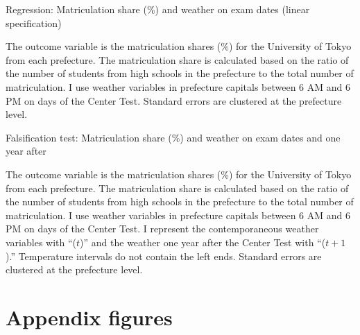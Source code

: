 \documentclass[12pt,letterpaper]{article}
\begin{document}
\begin{table}[H]
  \center
  \caption{Regression: Matriculation share (\%) and weather on exam dates (linear specification)}
  \small
  
  \label{tab:linear_reg}
  \small
  \begin{tablenotes}
    \item
      The outcome variable is the matriculation shares (\%) for the University of Tokyo from each prefecture.
      The matriculation share is calculated based on the ratio of the number of students from high schools in the prefecture to the total number of matriculation.
      I use weather variables in prefecture capitals between 6 AM and 6 PM on days of the Center Test.
      Standard errors are clustered at the prefecture level.
  \end{tablenotes}
\end{table}

\begin{table}[H]
  \center
  \caption{Falsification test: Matriculation share (\%) and weather on exam dates and one year after}
  \scriptsize
  
  \label{tab:reg_placebo_exam}
  \scriptsize
  \begin{tablenotes}
    \item
      The outcome variable is the matriculation shares (\%) for the University of Tokyo from each prefecture.
      The matriculation share is calculated based on the ratio of the number of students from high schools in the prefecture to the total number of matriculation.
      I use weather variables in prefecture capitals between 6 AM and 6 PM on days of the Center Test.
      I represent the contemporaneous weather variables with ``($t$)'' and the weather one year after the Center Test with ``($t + 1$).''
      Temperature intervals do not contain the left ends.
      Standard errors are clustered at the prefecture level.
  \end{tablenotes}
\end{table}

\setcounter{figure}{0}
\setcounter{table}{0}
\renewcommand\thefigure{\Alph{section}.\arabic{figure}}
\renewcommand\thetable{\Alph{section}.\arabic{table}}
  
\section{Appendix figures}\label{sec:appendix_figure}
\end{document}
